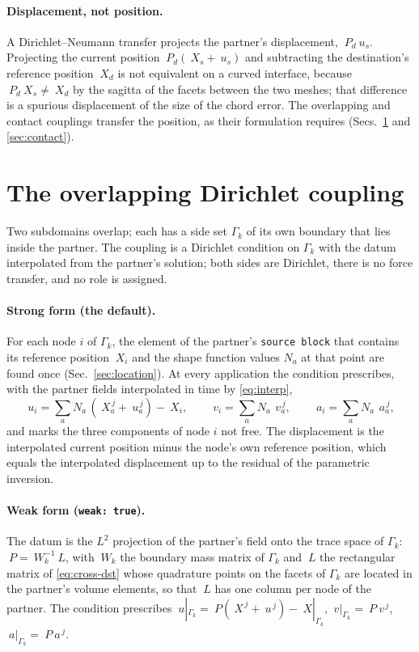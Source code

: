 \documentclass[11pt]{article}
\newcommand{\code}[1]{\texttt{#1}}
\begin{document}
\paragraph{Displacement, not position.} A Dirichlet--Neumann transfer
projects the partner's displacement, $~P_d ~u_s$. Projecting the current
position $~P_d(~X_s + ~u_s)$ and subtracting the destination's reference
position $~X_d$ is not equivalent on a curved interface, because
$~P_d ~X_s \ne ~X_d$ by the sagitta of the facets between the two meshes;
that difference is a spurious displacement of the size of the chord
error. The overlapping and contact couplings transfer the position, as
their formulation requires (Secs.~\ref{sec:overlap} and
\ref{sec:contact}).

\section{The overlapping Dirichlet coupling}
\label{sec:overlap}

Two subdomains overlap; each has a side set $\Gamma_k$ of its own boundary
that lies inside the partner. The coupling is a Dirichlet condition on
$\Gamma_k$ with the datum interpolated from the partner's solution; both
sides are Dirichlet, there is no force transfer, and no role is assigned.

\paragraph{Strong form (the default).} For each node $i$ of $\Gamma_k$,
the element of the partner's \code{source block} that contains its
reference position $~X_i$ and the shape function values $N_a$ at that point
are found once (Sec.~\ref{sec:location}). At every application the
condition prescribes, with the partner fields interpolated in time by
\eqref{eq:interp},
\begin{equation}
  ~u_i = \sum_a N_a\, (~X^{\,j}_a + ~u^{\,j}_a) - ~X_i, \qquad
  ~v_i = \sum_a N_a\, ~v^{\,j}_a, \qquad
  ~a_i = \sum_a N_a\, ~a^{\,j}_a ,
  \label{eq:overlap-strong}
\end{equation}
and marks the three components of node $i$ not free. The displacement is
the interpolated current position minus the node's own reference position,
which equals the interpolated displacement up to the residual of the
parametric inversion.

\paragraph{Weak form (\code{weak: true}).} The datum is the $L^2$
projection of the partner's field onto the trace space of $\Gamma_k$:
$~P = ~W_k^{-1} ~L$, with $~W_k$ the boundary mass matrix of $\Gamma_k$ and
$~L$ the rectangular matrix of \eqref{eq:cross-dst} whose quadrature points
on the facets of $\Gamma_k$ are located in the partner's volume elements,
so that $~L$ has one column per node of the partner. The condition
prescribes $~u|_{\Gamma_k} = ~P(~X^{\,j} + ~u^{\,j}) - ~X|_{\Gamma_k}$,
$~v|_{\Gamma_k} = ~P ~v^{\,j}$, $~a|_{\Gamma_k} = ~P ~a^{\,j}$.
\end{document}
